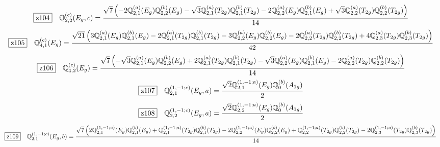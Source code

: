 \documentclass[fleqn,10pt,landscape]{jsarticle}
\begin{document}
\begin{dmath*}
\hspace*{3mm}\fbox{z104}\quad \mathbb{Q}_{2,2}^{(c)}(E_{g},c)=\frac{\sqrt{7} \left(- 2 \mathbb{Q}_{2,1}^{(a)}(E_{g}) \mathbb{Q}_{2,2}^{(b)}(E_{g}) - \sqrt{3} \mathbb{Q}_{2,1}^{(a)}(T_{2g}) \mathbb{Q}_{2,1}^{(b)}(T_{2g}) - 2 \mathbb{Q}_{2,2}^{(a)}(E_{g}) \mathbb{Q}_{2,1}^{(b)}(E_{g}) + \sqrt{3} \mathbb{Q}_{2,2}^{(a)}(T_{2g}) \mathbb{Q}_{2,2}^{(b)}(T_{2g})\right)}{14}
\end{dmath*}
\begin{dmath*}
\hspace*{3mm}\fbox{z105}\quad \mathbb{Q}_{4,1}^{(c)}(E_{g})=\frac{\sqrt{21} \left(3 \mathbb{Q}_{2,1}^{(a)}(E_{g}) \mathbb{Q}_{2,1}^{(b)}(E_{g}) - 2 \mathbb{Q}_{2,1}^{(a)}(T_{2g}) \mathbb{Q}_{2,1}^{(b)}(T_{2g}) - 3 \mathbb{Q}_{2,2}^{(a)}(E_{g}) \mathbb{Q}_{2,2}^{(b)}(E_{g}) - 2 \mathbb{Q}_{2,2}^{(a)}(T_{2g}) \mathbb{Q}_{2,2}^{(b)}(T_{2g}) + 4 \mathbb{Q}_{2,3}^{(a)}(T_{2g}) \mathbb{Q}_{2,3}^{(b)}(T_{2g})\right)}{42}
\end{dmath*}
\begin{dmath*}
\hspace*{3mm}\fbox{z106}\quad \mathbb{Q}_{4,2}^{(c)}(E_{g})=\frac{\sqrt{7} \left(- \sqrt{3} \mathbb{Q}_{2,1}^{(a)}(E_{g}) \mathbb{Q}_{2,2}^{(b)}(E_{g}) + 2 \mathbb{Q}_{2,1}^{(a)}(T_{2g}) \mathbb{Q}_{2,1}^{(b)}(T_{2g}) - \sqrt{3} \mathbb{Q}_{2,2}^{(a)}(E_{g}) \mathbb{Q}_{2,1}^{(b)}(E_{g}) - 2 \mathbb{Q}_{2,2}^{(a)}(T_{2g}) \mathbb{Q}_{2,2}^{(b)}(T_{2g})\right)}{14}
\end{dmath*}
\begin{dmath*}
\hspace*{3mm}\fbox{z107}\quad \mathbb{Q}_{2,1}^{(1,-1;c)}(E_{g},a)=\frac{\sqrt{2} \mathbb{Q}_{2,1}^{(1,-1;a)}(E_{g}) \mathbb{Q}_{0}^{(b)}(A_{1g})}{2}
\end{dmath*}
\begin{dmath*}
\hspace*{3mm}\fbox{z108}\quad \mathbb{Q}_{2,2}^{(1,-1;c)}(E_{g},a)=\frac{\sqrt{2} \mathbb{Q}_{2,2}^{(1,-1;a)}(E_{g}) \mathbb{Q}_{0}^{(b)}(A_{1g})}{2}
\end{dmath*}
\begin{dmath*}
\hspace*{3mm}\fbox{z109}\quad \mathbb{Q}_{2,1}^{(1,-1;c)}(E_{g},b)=\frac{\sqrt{7} \left(2 \mathbb{Q}_{2,1}^{(1,-1;a)}(E_{g}) \mathbb{Q}_{2,1}^{(b)}(E_{g}) + \mathbb{Q}_{2,1}^{(1,-1;a)}(T_{2g}) \mathbb{Q}_{2,1}^{(b)}(T_{2g}) - 2 \mathbb{Q}_{2,2}^{(1,-1;a)}(E_{g}) \mathbb{Q}_{2,2}^{(b)}(E_{g}) + \mathbb{Q}_{2,2}^{(1,-1;a)}(T_{2g}) \mathbb{Q}_{2,2}^{(b)}(T_{2g}) - 2 \mathbb{Q}_{2,3}^{(1,-1;a)}(T_{2g}) \mathbb{Q}_{2,3}^{(b)}(T_{2g})\right)}{14}
\end{dmath*}
\end{document}
